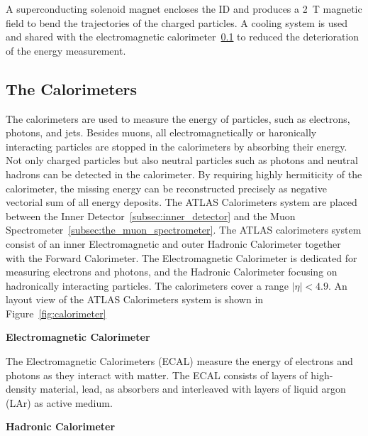 A superconducting solenoid magnet encloses the ID and produces a 2~T magnetic field to bend the trajectories of the charged particles.
A cooling system is used and shared with the electromagnetic calorimeter~\ref{subsec:calorimeter} to reduced the deterioration of the energy measurement.

\subsection{The Calorimeters}
\label{subsec:calorimeter}

The calorimeters are used to measure the energy of particles, such as electrons, photons, and jets.
Besides muons, all electromagnetically or haronically interacting particles are stopped in the calorimeters by absorbing their energy.
Not only charged particles but also neutral particles such as photons and neutral hadrons can be detected in the calorimeter.
By requiring highly hermiticity of the calorimeter, the missing energy can be reconstructed precisely as negative vectorial sum of all energy deposits.
The ATLAS Calorimeters system are placed between the Inner Detector~\ref{subsec:inner_detector} and the Muon Spectrometer~\ref{subsec:the_muon_spectrometer}.
The ATLAS calorimeters system consist of an inner Electromagnetic and outer Hadronic Calorimeter together with the Forward Calorimeter.
The Electromagnetic Calorimeter is dedicated for measuring electrons and photons, and the Hadronic Calorimeter focusing on hadronically interacting particles.
The calorimeters cover a range $|\eta| < 4.9$.
An layout view of the ATLAS Calorimeters system is shown in Figure~\ref{fig:calorimeter}

\noindent \textbf{Electromagnetic Calorimeter}

The Electromagnetic Calorimeters (ECAL) measure the energy of electrons and photons as they interact with matter.
The ECAL consists of layers of high-density material, lead, as absorbers and interleaved with layers of liquid argon (LAr) as active medium.





\noindent \textbf{Hadronic Calorimeter}


